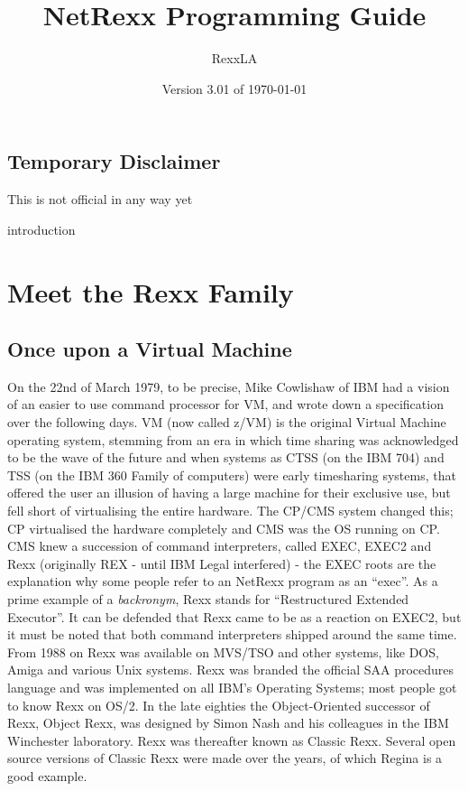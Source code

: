 \documentclass[10pt]{book}
\begin{document}
        
\setcounter{tocdepth}{1} 
\title{NetRexx Programming Guide}
\author{RexxLA}
\date{Version 3.01 of \today}
\maketitle
{}
\pagestyle{plain}
\frontmatter
{}
\pagestyle{plain}
\section*{Temporary Disclaimer}
This is not official in any way yet
\newpage
\tableofcontents
\newpage
{}
\frontmatter
\large


 {introduction}
\mainmatter
\chapter{Meet the Rexx Family}
\section{Once upon a Virtual Machine}
On the 22nd of March 1979, to be precise, Mike Cowlishaw of IBM had a
vision of an easier to use command processor for VM, and wrote down a
specification over the following days.
VM\textsuperscript{\texttrademark} (now called z/VM) is the original Virtual Machine operating system,  stemming from an
era in which time sharing was acknowledged to be the wave of the
future and when systems as CTSS (on the IBM 704) and TSS (on the IBM
360 Family of computers) were early timesharing systems, that offered
the user an illusion of having a large machine for their exclusive
use, but fell short of virtualising the entire hardware. The CP/CMS
system changed this; CP virtualised the hardware completely and CMS was the OS
running on CP. CMS knew a succession of command interpreters, called
EXEC, EXEC2 and Rexx\textsuperscript{\texttrademark}  (originally REX - until IBM Legal interfered) -
the EXEC roots are the explanation why some people refer to an NetRexx
program as an ``exec''. As a prime example of a \emph{backronym}, Rexx
stands for ``Restructured Extended Executor''. It
can be defended that Rexx came to be as a reaction on EXEC2, but it
must be noted that both command interpreters shipped around the same
time. From 1988 on Rexx was available on MVS/TSO and other systems,
like DOS, Amiga and various Unix systems. Rexx was branded the
official SAA procedures language and was implemented on all IBM's
Operating Systems; most people got to know Rexx on OS/2. In the late
eighties the Object-Oriented successor of Rexx, Object Rexx, was
designed by Simon Nash and his colleagues in the IBM Winchester
laboratory. Rexx was thereafter known as Classic Rexx. Several open
source versions of Classic Rexx were made over the years, of which
Regina is a good example.
\end{document}
